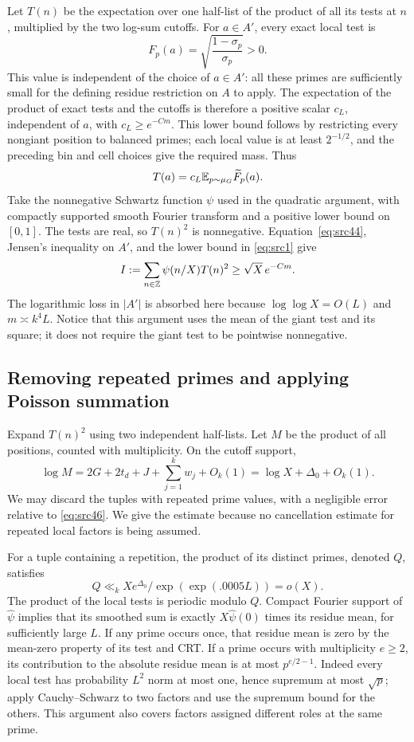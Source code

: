 Let $T(n)$ be the expectation over one half-list of the product of
all its tests at $n$, multiplied by the two log-sum cutoffs.  For
$a\in A'$, every exact local test is
\[
                     F_p(a)=\sqrt{\frac{1-\sigma_p}{\sigma_p}}>0.
\]
This value is independent of the choice of $a\in A'$: all these
primes are sufficiently small for the defining residue restriction
on $A$ to apply.  The expectation of the product of exact tests and
the cutoffs is therefore a positive scalar $c_L$, independent of
$a$, with $c_L\ge e^{-Cm}$.  This lower bound follows by restricting
every nongiant position to balanced primes; each local value is at
least $2^{-1/2}$, and the preceding bin and cell choices give the
required mass.  Thus
\[
                    T(a)=c_L\mathbb E_{p\sim\mu_G}\widetilde F_p(a).
\]
Take the nonnegative Schwartz function $\psi$ used in the quadratic
argument, with compactly supported smooth Fourier transform and a
positive lower bound on $[0,1]$.  The tests are real, so $T(n)^2$ is
nonnegative.  Equation~\eqref{eq:src44}, Jensen's inequality on $A'$,
and the lower bound in \eqref{eq:src1} give
\begin{equation}
              I:=\sum_{n\in\mathbb Z}\psi(n/X)T(n)^2
                   \ge \sqrt X\,e^{-Cm}.
 \label{eq:src46}
\end{equation}
The logarithmic loss in $|A'|$ is absorbed here because
$\log\log X=O(L)$ and $m\asymp k^4L$.  Notice that this argument
uses the mean of the giant test and its square; it does not require
the giant test to be pointwise nonnegative.

\subsection{Removing repeated primes and applying Poisson summation}

Expand $T(n)^2$ using two independent half-lists.  Let $M$ be the
product of all positions, counted with multiplicity.  On the cutoff
support,
\[
 \log M=2G+2t_d+J+\sum_{j=1}^kw_j+O_k(1)
        =\log X+\Delta_0+O_k(1).
\]
We may discard the tuples with repeated prime values, with a
negligible error relative to \eqref{eq:src46}.  We give the estimate
because no cancellation estimate for repeated local factors is
being assumed.

For a tuple containing a repetition, the product of its distinct
primes, denoted $Q$, satisfies
\[
 Q\ll_k X e^{\Delta_0}/\exp(\exp(.0005L))=o(X).
\]
The product of the local tests is periodic modulo $Q$.  Compact
Fourier support of $\widehat\psi$ implies that its smoothed sum is
exactly $X\widehat\psi(0)$ times its residue mean, for sufficiently
large $L$.  If any prime occurs once, that residue mean is zero by
the mean-zero property of its test and CRT.  If a prime occurs with
multiplicity $e\ge2$, its contribution to the absolute residue
mean is at most $p^{e/2-1}$.  Indeed every local test has probability
$L^2$ norm at most one, hence supremum at most $\sqrt p$; apply
Cauchy--Schwarz to two factors and use the supremum bound for the
others.  This argument also covers factors assigned different
roles at the same prime.

